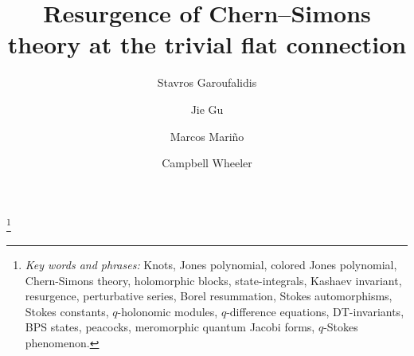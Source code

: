 \documentclass[12pt,reqno]{amsart}
\theoremstyle{definition}
\def\md{\mathbf}
\newcommand{\knot}[1]{\md{#1}}
\begin{document}
\title[Resurgence of Chern--Simons theory at the trivial flat
connection]{Resurgence of Chern--Simons theory at the trivial flat
  connection}%
\author{Stavros Garoufalidis}%
\address{%
  International Center for Mathematics, Department of Mathematics \\
  Southern University of Science and Technology \\
  Shenzhen, China \newline
  {\tt \url{http://people.mpim-bonn.mpg.de/stavros}}}
\author{Jie Gu}
\address{D\'epartement de Physique Th\'eorique, Universit\'e de Gen\`eve \\
  Universit\'e de Gen\`eve, 1211 Gen\`eve 4, Switzerland}
\address{Shing-Tung Yau Center and School of Physics\\
Southeast University, Nanjing 210096, China}
\author{Marcos Mari\~no}
\address{Section de Math\'ematiques et D\'epartement de Physique Th\'eorique\\
Universit\'e de Gen\`eve, 1211 Gen\`eve 4, Switzerland  \newline
  {\tt \url{http://www.marcosmarino.net}}}
\author{Campbell Wheeler}
\address{Max Planck Institute for Mathematics \\
         Vivatsgasse 7, 53111 Bonn, Germany \newline
  {\tt \url{https://guests.mpim-bonn.mpg.de/cjwh/}}}
       

\thanks{
{\em Key words and phrases:}
Knots, Jones polynomial, colored Jones polynomial, Chern-Simons theory,
holomorphic blocks, state-integrals, Kashaev invariant, 
resurgence, perturbative series, Borel resummation, Stokes automorphisms,
Stokes constants, $q$-holonomic modules, $q$-difference equations, DT-invariants,
BPS states, peacocks, meromorphic quantum Jacobi forms, $q$-Stokes phenomenon.
}
\end{document}

